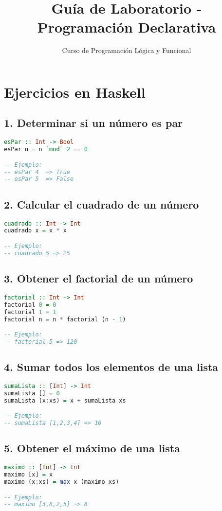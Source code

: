\documentclass[12pt]{article}
\title{Guía de Laboratorio - Programación Declarativa}
\author{Curso de Programación Lógica y Funcional}
\date{}
\begin{document}
\maketitle

\section*{Ejercicios en Haskell}

\subsection*{1. Determinar si un número es par}
\begin{lstlisting}[language=Haskell]
esPar :: Int -> Bool
esPar n = n `mod` 2 == 0

-- Ejemplo:
-- esPar 4  => True
-- esPar 5  => False
\end{lstlisting}

\subsection*{2. Calcular el cuadrado de un número}
\begin{lstlisting}[language=Haskell]
cuadrado :: Int -> Int
cuadrado x = x * x

-- Ejemplo:
-- cuadrado 5 => 25
\end{lstlisting}

\subsection*{3. Obtener el factorial de un número}
\begin{lstlisting}[language=Haskell]
factorial :: Int -> Int
factorial 0 = 0
factorial 1 = 1
factorial n = n * factorial (n - 1)

-- Ejemplo:
-- factorial 5 => 120
\end{lstlisting}

\subsection*{4. Sumar todos los elementos de una lista}
\begin{lstlisting}[language=Haskell]
sumaLista :: [Int] -> Int
sumaLista [] = 0
sumaLista (x:xs) = x + sumaLista xs

-- Ejemplo:
-- sumaLista [1,2,3,4] => 10
\end{lstlisting}

\subsection*{5. Obtener el máximo de una lista}
\begin{lstlisting}[language=Haskell]
maximo :: [Int] -> Int
maximo [x] = x
maximo (x:xs) = max x (maximo xs)

-- Ejemplo:
-- maximo [3,8,2,5] => 8
\end{lstlisting}
\end{document}
